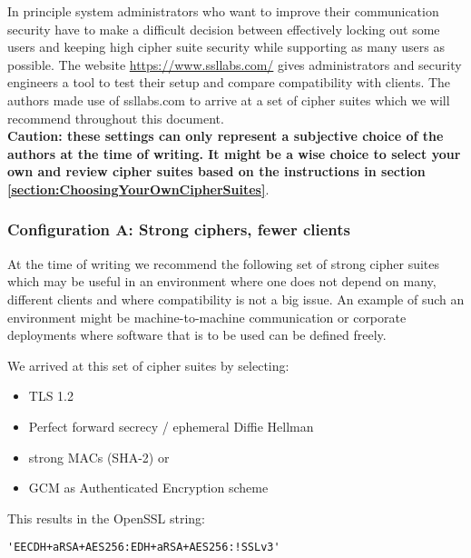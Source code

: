 
In principle system administrators who want to improve their communication security
have to make a difficult decision between effectively locking out some users and 
keeping high cipher suite security while supporting as many users as possible.
The website \url{https://www.ssllabs.com/} gives administrators and security engineers
a tool to test their setup and compare compatibility with clients. The authors made 
use of ssllabs.com to arrive at a set of cipher suites which we will recommend 
throughout this document.\\

\textbf{Caution: these settings can only represent a subjective
choice of the authors at the time of writing. It might be a wise choice to
select your own and review cipher suites based on the instructions in section
\ref{section:ChoosingYourOwnCipherSuites}}.


\subsubsection{Configuration A: Strong ciphers, fewer clients}

At the time of writing we recommend the following set of strong cipher
suites which may be useful in an environment where one does not depend on many,
different clients and where compatibility is not a big issue.  An example
of such an environment might be machine-to-machine communication or corporate
deployments where software that is to be used can be defined freely.


We arrived at this set of cipher suites by selecting:

\begin{itemize}
\item TLS 1.2
\item Perfect forward secrecy / ephemeral Diffie Hellman
\item strong MACs (SHA-2) or
\item GCM as Authenticated Encryption scheme
\end{itemize}

This results in the OpenSSL string:

\begin{lstlisting}[breaklines]
'EECDH+aRSA+AES256:EDH+aRSA+AES256:!SSLv3'
\end{lstlisting}

